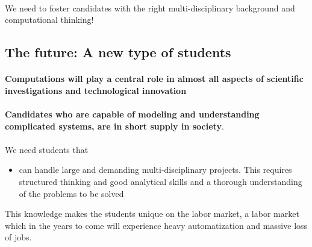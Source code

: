 \documentclass[%
twoside,                 %
final,                   %
10pt]{article}
\begin{document}
\noindent




\paragraph{}
We need to foster candidates with the right
multi-disciplinary background and computational thinking!




\subsection{The future: A new type of students}


\paragraph{}
\textbf{Computations will play a central role in almost all aspects of scientific investigations and technological innovation}




\paragraph{}
\textbf{Candidates who are capable of modeling and understanding complicated systems, are in short supply in society}.



\paragraph{}
We need students that
\begin{itemize}
\item can handle large and demanding multi-disciplinary  projects. This requires structured thinking and good analytical skills and a thorough understanding of the problems to be solved
\end{itemize}

\noindent
This knowledge makes the students unique on the labor market, a labor market which in the years to come will experience heavy automatization and massive loss of jobs.



\end{document}
